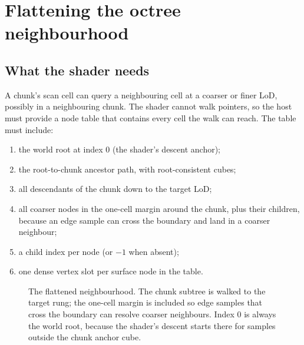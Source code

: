\section{Flattening the octree neighbourhood}
\label{sec:flatten}

\subsection{What the shader needs}

A chunk's scan cell can query a neighbouring cell at a coarser or finer
LoD, possibly in a neighbouring chunk.  The shader cannot walk pointers, so
the host must provide a node table that contains every cell the walk can
reach.  The table must include:

\begin{enumerate}
\item the world root at index 0 (the shader's descent anchor);
\item the root-to-chunk ancestor path, with root-consistent cubes;
\item all descendants of the chunk down to the target LoD;
\item all coarser nodes in the one-cell margin around the chunk, plus
  their children, because an edge sample can cross the boundary and land
  in a coarser neighbour;
\item a child index per node (or $-1$ when absent);
\item one dense vertex slot per surface node in the table.
\end{enumerate}

\begin{figure}[htbp]
\centering
{}
\caption{The flattened neighbourhood.  The chunk subtree is walked to the
target rung; the one-cell margin is included so edge samples that cross
the boundary can resolve coarser neighbours.  Index 0 is always the world
root, because the shader's descent starts there for samples outside the
chunk anchor cube.}
\label{fig:flatten}
\end{figure}

